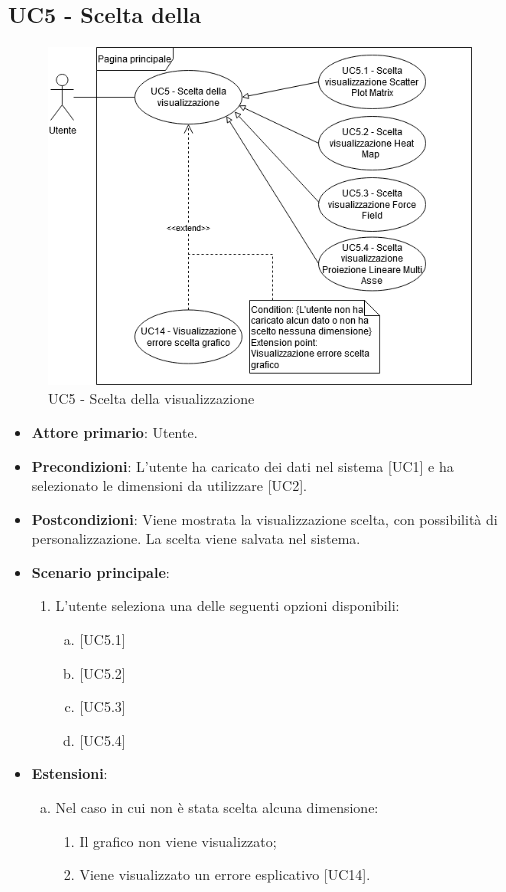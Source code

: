 \subsection{UC5 - Scelta della }
\begin{figure}[h]
\includegraphics[width=\linewidth]{section/Images/UC5.png}
\centering
\caption{UC5 - Scelta della visualizzazione}
\end{figure}
\begin{itemize}
	\item \textbf{Attore primario}: Utente.
	\item \textbf{Precondizioni}: L'utente ha caricato dei dati nel sistema [UC1] e ha selezionato le dimensioni da utilizzare [UC2].
	\item \textbf{Postcondizioni}: Viene mostrata la visualizzazione scelta, con possibilità di personalizzazione. La scelta viene salvata nel sistema.
	\item \textbf{Scenario principale}:
\begin{enumerate}
	\item	L'utente seleziona una delle seguenti opzioni disponibili:
		\begin{enumerate}[(a)]
			\item {}
			\item {}
			\item {}
			\item {}
		\end{enumerate}
\end{enumerate}
	\item \textbf{Estensioni}:
	\begin{enumerate}[(a)]
		\item Nel caso in cui non è stata scelta alcuna dimensione:
		\begin{enumerate}[1.]
			\item Il grafico non viene visualizzato;
			\item Viene visualizzato un errore esplicativo [UC14].
		\end{enumerate}
	\end{enumerate}
\end{itemize}